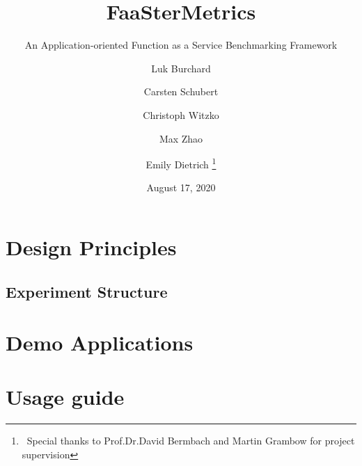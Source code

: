 \documentclass[english,12pt,numbers=noenddot]{scrreprt}
\newif\ifmtrklnum{}
\begin{document}
%
\titlehead{%
  \texttt{[image: MCC\_Header.png]}
}
%
\title{FaaSterMetrics}
\subtitle{An Application-oriented Function as a Service Benchmarking Framework}
%
\ifmtrklnum{}
\author{Luk Burchard ()
  \and Carsten Schubert (380852) 
  \and Christoph Witzko (373678)
  \and Max Zhao ()
  \and Emily Dietrich (380817)~%
  \thanks{~Special thanks to Prof.\@ Dr.\@ David Bermbach and Martin Grambow for project supervision}}
\else
\author{Luk Burchard %
  \and Carsten Schubert %
  \and Christoph Witzko %
  \and Max Zhao %
  \and Emily Dietrich%
  \thanks{~Special thanks to Prof.\@ Dr.\@ David Bermbach and Martin Grambow for project supervision}}
\fi
%
\date{August 17, 2020}
\maketitle

\renewcommand*\contentsname{Structure}
\tableofcontents
\listoffigures
\listoftables
\newpage



\chapter{Design Principles}\label{chap:DesignPrinciples}





\section{Experiment Structure}



\chapter{Demo Applications}




\chapter{Usage guide}






\appendix

\end{document}
